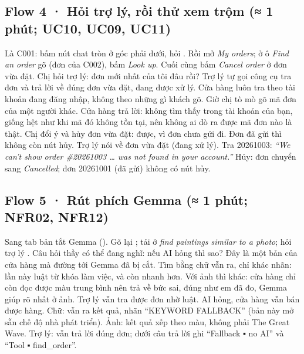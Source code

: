 \subsection{Flow 4 · Hỏi trợ lý, rồi thử xem trộm \normalfont\small(≈ 1 phút; UC10, UC09, UC11)}
Là C001: bấm nút chat tròn ở góc phải dưới, hỏi . Rồi mở \emph{My orders}; ở ô \emph{Find an order} gõ  (đơn của C002), bấm \emph{Look up}. Cuối cùng bấm \emph{Cancel order} ở đơn vừa đặt.
Chị hỏi trợ lý: đơn mới nhất của tôi đâu rồi? Trợ lý tự gọi công cụ tra đơn và trả lời về đúng đơn vừa đặt, đang được xử lý. Cửa hàng luôn tra theo tài khoản đang đăng nhập, không theo những gì khách gõ.  Giờ chị tò mò gõ mã đơn của một người khác. Cửa hàng trả lời: không tìm thấy trong tài khoản của bạn, giống hệt như khi mã đó không tồn tại, nên không ai dò ra được mã đơn nào là thật.  Chị đổi ý và hủy đơn vừa đặt: được, vì đơn chưa gửi đi. Đơn đã gửi thì không còn nút hủy.
Trợ lý nói về đơn vừa đặt (đang xử lý). Tra 20261003: \emph{``We can't show order \#20261003 \ldots{} was not found in your account.''} Hủy: đơn chuyển sang \emph{Cancelled}; đơn 20261001 (đã gửi) không có nút hủy.

\subsection{Flow 5 · Rút phích Gemma \normalfont\small(≈ 1 phút; NFR02, NFR12)}
Sang tab bản tắt Gemma (). Gõ lại ; tải  ở \emph{find paintings similar to a photo}; hỏi trợ lý .
Câu hỏi thầy có thể đang nghĩ: nếu AI hỏng thì sao? Đây là một bản của cửa hàng mà đường tới Gemma đã bị cắt. Tìm bằng chữ vẫn ra, chỉ khác nhãn: lần này luật từ khóa làm việc, và còn nhanh hơn. Với ảnh thì khác: cửa hàng chỉ còn đọc được màu trung bình nên trả về bức sai, đúng như em đã đo, Gemma giúp rõ nhất ở ảnh. Trợ lý vẫn tra được đơn nhờ luật. AI hỏng, cửa hàng vẫn bán được hàng.
Chữ: vẫn ra kết quả, nhãn ``KEYWORD FALLBACK'' (bản này mở sẵn chế độ nhà phát triển). Ảnh: kết quả xếp theo màu, không phải The Great Wave. Trợ lý: vẫn trả lời đúng đơn; dưới câu trả lời ghi ``Fallback ▪ no AI'' và ``Tool ▪ find\_order''.

